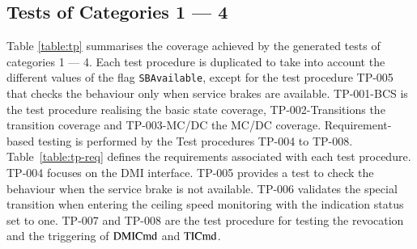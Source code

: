 \begin{table}[htbp]
\egroup
\end{table}


\subsection{Tests of Categories 1 --- 4}


Table \ref{table:tp} summarises the coverage achieved by the generated
tests of categories 1 --- 4. Each test procedure is duplicated to take into account the
different values of the flag \verb+SBAvailable+, except for the test
procedure TP-005 that checks the behaviour only when service brakes are
available. TP-001-BCS is the
test procedure realising the basic state coverage, TP-002-Transitions
the transition coverage and TP-003-MC/DC the MC/DC coverage.
Requirement-based testing is performed by the Test procedures TP-004
to TP-008. Table~\ref{table:tp-req} defines the requirements associated
with each test procedure. TP-004 focuses on the DMI interface.  TP-005
provides a test to check the behaviour when the service brake is not
available. TP-006 validates the special transition when entering the
ceiling speed monitoring with the indication status set to
one. TP-007 and TP-008 are the test procedure for testing the
revocation and the triggering of $\text{DMICmd}$ and $\text{TICmd}$.

